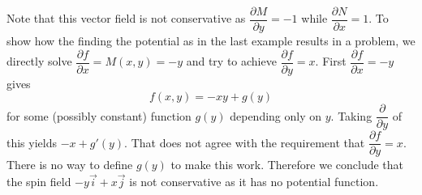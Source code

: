 {Note that this vector field is not conservative as $\dfrac{\partial M}{\partial y} = -1$ while $\dfrac{\partial N}{\partial x} = 1$.  To show how the finding the potential as in the last example results in a problem, we directly solve $\dfrac{\partial f}{\partial x} = M(x,y) = -y$ and try to achieve $\dfrac{\partial f}{\partial y} = x$. First $\dfrac{\partial f}{\partial x} = -y$ gives 
$$f(x,y) = -xy + g(y)$$
for some (possibly constant) function $g(y)$ depending only on $y$. Taking $\dfrac{\partial}{\partial y}$ of this yields $-x + g'(y)$. That does not agree with the requirement that
$\dfrac{\partial f}{\partial y} = x$. There is no way to define $g(y)$ to make this work.  Therefore we conclude that the spin field $-y\vec i + x\vec j$ is not conservative as it has no potential function.}


